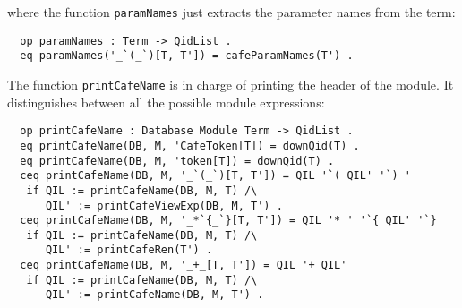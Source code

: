\noindent
where the function \verb"paramNames" just extracts the parameter names from
the term:

{\codesize
\begin{verbatim}
  op paramNames : Term -> QidList .
  eq paramNames('_`(_`)[T, T']) = cafeParamNames(T') .
\end{verbatim}
}

The function \verb"printCafeName" is in charge of printing the header
of the module. It distinguishes between all the possible module expressions:

{\codesize
\begin{verbatim}
  op printCafeName : Database Module Term -> QidList .
  eq printCafeName(DB, M, 'CafeToken[T]) = downQid(T) .
  eq printCafeName(DB, M, 'token[T]) = downQid(T) .
  ceq printCafeName(DB, M, '_`(_`)[T, T']) = QIL '`( QIL' '`) '
   if QIL := printCafeName(DB, M, T) /\
      QIL' := printCafeViewExp(DB, M, T') .
  ceq printCafeName(DB, M, '_*`{_`}[T, T']) = QIL '* ' '`{ QIL' '`}
   if QIL := printCafeName(DB, M, T) /\
      QIL' := printCafeRen(T') .
  ceq printCafeName(DB, M, '_+_[T, T']) = QIL '+ QIL'
   if QIL := printCafeName(DB, M, T) /\
      QIL' := printCafeName(DB, M, T') .
\end{verbatim}
}

